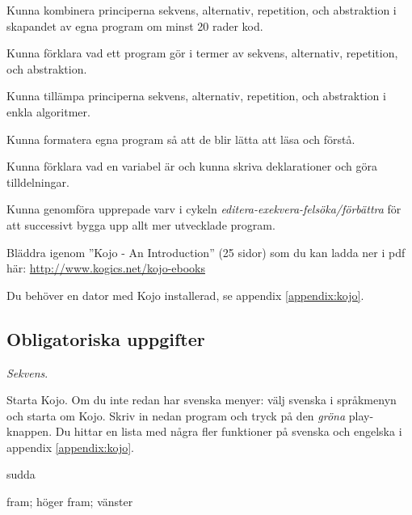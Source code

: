 
\Lab{\LabWeekONE}

\begin{Goals}
\item Kunna kombinera principerna sekvens, alternativ, repetition, och abstraktion i skapandet av egna program om minst 20 rader kod.
\item Kunna förklara vad ett program gör i termer av sekvens, alternativ, repetition, och abstraktion.
\item Kunna tillämpa principerna sekvens, alternativ, repetition, och abstraktion i enkla algoritmer.
\item Kunna formatera egna program så att de blir lätta att läsa och förstå.
\item Kunna förklara vad en variabel är och kunna skriva deklarationer och göra tilldelningar.
\item Kunna genomföra upprepade varv i cykeln \emph{editera-exekvera-felsöka/förbättra} för att successivt bygga upp allt mer utvecklade program.
\end{Goals}

\begin{Preparations}
\item {}%
\item Bläddra igenom ''Kojo - An Introduction'' (25 sidor) som du kan ladda ner i pdf  här: \href{http://www.kogics.net/kojo-ebooks}{http://www.kogics.net/kojo-ebooks}
\item Du behöver en dator med Kojo installerad, se appendix \ref{appendix:kojo}.
\end{Preparations}

\subsection{Obligatoriska uppgifter}


\Task \textit{Sekvens}.

\Subtask Starta Kojo. Om du inte redan har svenska menyer: välj svenska i språkmenyn och starta om Kojo.  Skriv in nedan program och tryck på den \emph{gröna} play-knappen. Du hittar en lista med några fler funktioner på svenska och engelska i appendix \ref{appendix:kojo}.

\begin{Code}
sudda

fram; höger
fram; vänster
\end{Code}


